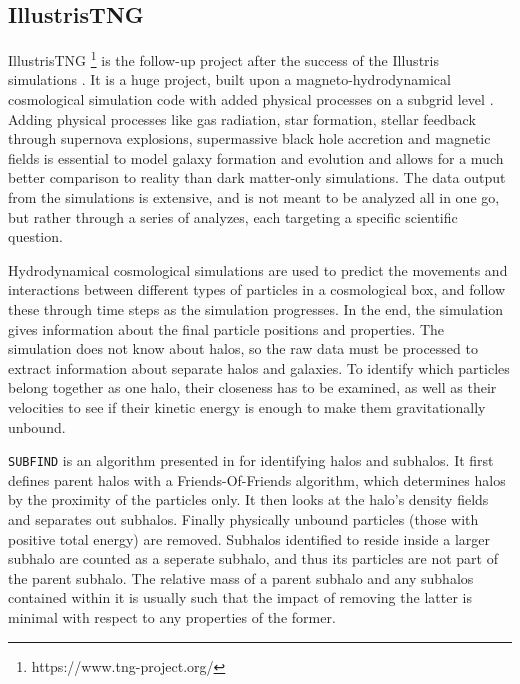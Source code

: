 \subsection{IllustrisTNG}
IllustrisTNG \footnote{https://www.tng-project.org/} is the follow-up project after the success of the Illustris simulations \parencite{Springel2017, Pillepich2017,Naiman2018, Nelson2017, Marinacci2018}. It is a huge project, built upon a magneto-hydrodynamical cosmological simulation code with added physical processes on a subgrid level \parencite{Weinberger2016}. Adding physical processes like gas radiation, star formation, stellar feedback through supernova explosions, supermassive black hole accretion and magnetic fields is essential to model galaxy formation and evolution and allows for a much better comparison to reality than dark matter-only simulations. The data output from the simulations is extensive, and is not meant to be analyzed all in one go, but rather through a series of analyzes, each targeting a specific scientific question. 

Hydrodynamical cosmological simulations are used to predict the movements and interactions between different types of particles in a cosmological box, and follow these through time steps as the simulation progresses. In the end, the simulation gives information about the final particle positions and properties. The simulation does not know about halos, so the raw data must be processed to extract information about separate halos and galaxies. To identify which particles belong together as one halo, their closeness has to be examined, as well as their velocities to see if their kinetic energy is enough to make them gravitationally unbound.

\texttt{SUBFIND} is an algorithm presented in \textcite{Springel2001} for identifying halos and subhalos. It first defines parent halos with a Friends-Of-Friends algorithm, which determines halos by the proximity of the particles only. It then looks at the halo's density fields and separates out subhalos. Finally physically unbound particles (those with positive total energy) are removed. Subhalos identified to reside inside a larger subhalo are counted as a seperate subhalo, and thus its particles are not part of the parent subhalo. The relative mass of a parent subhalo and any subhalos contained within it is usually such that the impact of removing the latter is minimal with respect to any properties of the former.


